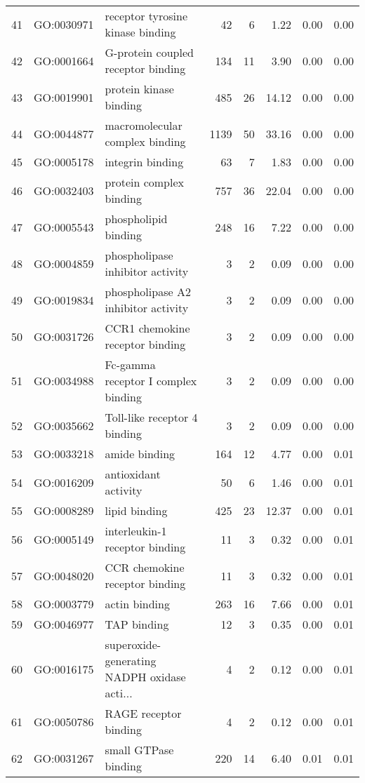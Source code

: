 \begin{table}[ht]
\begin{tabular}{rllrrrrr}
  41 & GO:0030971 & receptor tyrosine kinase binding &  42 &   6 & 1.22 & 0.00 & 0.00 \\ 
  42 & GO:0001664 & G-protein coupled receptor binding & 134 &  11 & 3.90 & 0.00 & 0.00 \\ 
  43 & GO:0019901 & protein kinase binding & 485 &  26 & 14.12 & 0.00 & 0.00 \\ 
  44 & GO:0044877 & macromolecular complex binding & 1139 &  50 & 33.16 & 0.00 & 0.00 \\ 
  45 & GO:0005178 & integrin binding &  63 &   7 & 1.83 & 0.00 & 0.00 \\ 
  46 & GO:0032403 & protein complex binding & 757 &  36 & 22.04 & 0.00 & 0.00 \\ 
  47 & GO:0005543 & phospholipid binding & 248 &  16 & 7.22 & 0.00 & 0.00 \\ 
  48 & GO:0004859 & phospholipase inhibitor activity &   3 &   2 & 0.09 & 0.00 & 0.00 \\ 
  49 & GO:0019834 & phospholipase A2 inhibitor activity &   3 &   2 & 0.09 & 0.00 & 0.00 \\ 
  50 & GO:0031726 & CCR1 chemokine receptor binding &   3 &   2 & 0.09 & 0.00 & 0.00 \\ 
  51 & GO:0034988 & Fc-gamma receptor I complex binding &   3 &   2 & 0.09 & 0.00 & 0.00 \\ 
  52 & GO:0035662 & Toll-like receptor 4 binding &   3 &   2 & 0.09 & 0.00 & 0.00 \\ 
  53 & GO:0033218 & amide binding & 164 &  12 & 4.77 & 0.00 & 0.01 \\ 
  54 & GO:0016209 & antioxidant activity &  50 &   6 & 1.46 & 0.00 & 0.01 \\ 
  55 & GO:0008289 & lipid binding & 425 &  23 & 12.37 & 0.00 & 0.01 \\ 
  56 & GO:0005149 & interleukin-1 receptor binding &  11 &   3 & 0.32 & 0.00 & 0.01 \\ 
  57 & GO:0048020 & CCR chemokine receptor binding &  11 &   3 & 0.32 & 0.00 & 0.01 \\ 
  58 & GO:0003779 & actin binding & 263 &  16 & 7.66 & 0.00 & 0.01 \\ 
  59 & GO:0046977 & TAP binding &  12 &   3 & 0.35 & 0.00 & 0.01 \\ 
  60 & GO:0016175 & superoxide-generating NADPH oxidase acti... &   4 &   2 & 0.12 & 0.00 & 0.01 \\ 
  61 & GO:0050786 & RAGE receptor binding &   4 &   2 & 0.12 & 0.00 & 0.01 \\ 
  62 & GO:0031267 & small GTPase binding & 220 &  14 & 6.40 & 0.01 & 0.01 \\ 

\end{tabular}
\end{table}
